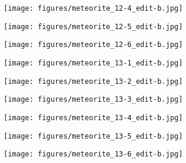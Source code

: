 \documentclass[a4paper, 11pt, oneside]{article}
\begin{document}
\clearpage
\begin{figure}[t]
\texttt{[image: figures/meteorite\_12-4\_edit-b.jpg]}
\caption{}
\centering
\end{figure}
\clearpage
\begin{figure}[t]
\texttt{[image: figures/meteorite\_12-5\_edit-b.jpg]}
\caption{}
\centering
\end{figure}
\clearpage
\begin{figure}[t]
\texttt{[image: figures/meteorite\_12-6\_edit-b.jpg]}
\caption{}
\centering
\end{figure}
\clearpage
{}
\begin{figure}[t]
\texttt{[image: figures/meteorite\_13-1\_edit-b.jpg]}
\caption{}
\centering
\end{figure}
\clearpage
\begin{figure}[t]
\texttt{[image: figures/meteorite\_13-2\_edit-b.jpg]}
\caption{}
\centering
\end{figure}
\clearpage
\begin{figure}[t]
\texttt{[image: figures/meteorite\_13-3\_edit-b.jpg]}
\caption{}
\centering
\end{figure}
\clearpage
\begin{figure}[t]
\texttt{[image: figures/meteorite\_13-4\_edit-b.jpg]}
\caption{}
\centering
\end{figure}
\clearpage
\begin{figure}[t]
\texttt{[image: figures/meteorite\_13-5\_edit-b.jpg]}
\caption{}
\centering
\end{figure}
\clearpage
\begin{figure}[t]
\texttt{[image: figures/meteorite\_13-6\_edit-b.jpg]}
\caption{}
\centering
\end{figure}
\end{document}
